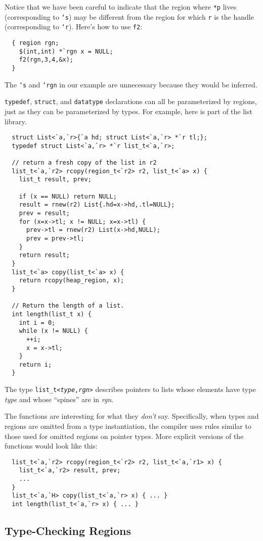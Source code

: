Notice that we have been careful to indicate that the region where
\texttt{*p} lives (corresponding to \texttt{`s}) may be different from
the region for which \texttt{r} is the handle (corresponding to
\texttt{`r}).  Here's how to use \texttt{f2}:
\begin{verbatim}
  { region rgn;
    $(int,int) *`rgn x = NULL; 
    f2(rgn,3,4,&x);
  }
\end{verbatim} %
The \texttt{`s} and \texttt{`rgn} in our example are unnecessary
because they would be inferred.

\texttt{typedef}, \texttt{struct}, and \texttt{datatype}
declarations can all be parameterized by regions,
just as they can be parameterized by types.  For example, here is part
of the list library.
\begin{verbatim}
  struct List<`a,`r>{`a hd; struct List<`a,`r> *`r tl;};
  typedef struct List<`a,`r> *`r list_t<`a,`r>;

  // return a fresh copy of the list in r2
  list_t<`a,`r2> rcopy(region_t<`r2> r2, list_t<`a> x) {
    list_t result, prev;

    if (x == NULL) return NULL;
    result = rnew(r2) List{.hd=x->hd,.tl=NULL};
    prev = result;
    for (x=x->tl; x != NULL; x=x->tl) {
      prev->tl = rnew(r2) List(x->hd,NULL);
      prev = prev->tl;
    }
    return result;
  }  
  list_t<`a> copy(list_t<`a> x) {
    return rcopy(heap_region, x);
  }

  // Return the length of a list. 
  int length(list_t x) {
    int i = 0;
    while (x != NULL) {
      ++i;
      x = x->tl;
    }
    return i;
  }
\end{verbatim}
The type \texttt{list\_t<\textit{type},\textit{rgn}>} describes
pointers to lists whose elements have type \textit{type} and whose
``spines'' are in \textit{rgn}.  

The functions are interesting for what they \emph{don't} say.
Specifically, when types and regions are omitted from a type
instantiation, the compiler uses rules similar to those used for
omitted regions on pointer types.  More explicit versions of the
functions would look like this:
\begin{verbatim}
  list_t<`a,`r2> rcopy(region_t<`r2> r2, list_t<`a,`r1> x) {
    list_t<`a,`r2> result, prev;
    ...
  }
  list_t<`a,`H> copy(list_t<`a,`r> x) { ... }
  int length(list_t<`a,`r> x) { ... }
\end{verbatim}

\subsection{Type-Checking Regions}

